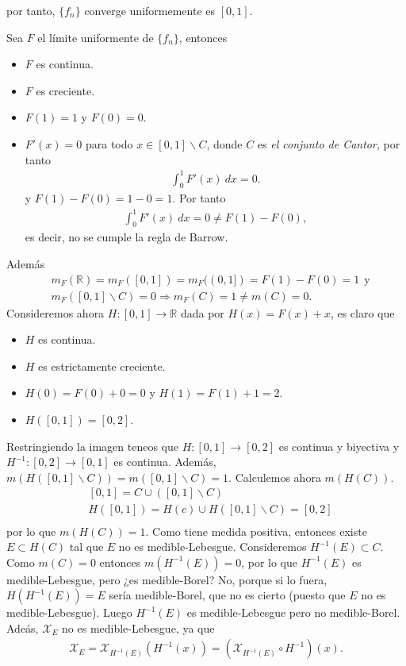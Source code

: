 \begin{ejemplo}
\begin{itemize}
    por tanto, $\{f_n\}$ converge uniformemente es $[0,1]$.
\end{itemize}
Sea $F$ el límite uniformente de $\{f_n\}$, entonces
\begin{itemize}
    \item $F$ es continua.
    \item $F$ es creciente.
    \item $F(1) = 1$ y $F(0) = 0$.
    \item $F'(x) = 0$ para todo $x \in [0,1] \backslash C$, donde $C$ es \textit{el conjunto de Cantor}, por tanto
    \begin{align*}
        \int_{0}^{1}{F'(x) \ dx}  = 0.
    \end{align*}
    y $F(1) - F(0) = 1 - 0 = 1$. Por tanto
    \begin{align*}
        \int_{0}^{1}{F'(x) \ dx}  = 0 \not = F(1) - F(0),
    \end{align*}
    es decir, no se cumple la regla de Barrow.
\end{itemize}
Además
\begin{align*}
    &m_F(\mathbb{R}) = m_F([0,1]) = m_F((0,1]) = F(1) - F(0) = 1 \ \ \text{y} \\
    &m_F([0,1] \backslash C) = 0 \Longrightarrow m_F(C) = 1 \not = m(C) = 0.
\end{align*}
Consideremos ahora $H: [0,1] \longrightarrow \mathbb{R}$ dada por $H(x) = F(x) + x$, es claro que
\begin{itemize}
    \item $H$ es continua.
    \item $H$ es estrictamente creciente.
    \item $H(0) = F(0) + 0 = 0$ y $H(1) = F(1) + 1 = 2$.
    \item $H([0,1]) = [0,2]$.
\end{itemize}
Restringiendo la imagen teneos que $H : [0,1] \longrightarrow [0,2]$ es continua y biyectiva y $H^{-1} : [0,2] \longrightarrow [0,1]$ es continua. Además, $m(H([0,1]\backslash C)) = m([0,1]\backslash C) = 1$. Calculemos ahora $m(H(C))$.
\begin{align*}
    &[0,1] = C \cup ([0,1] \backslash C) \\
    &H([0,1]) = H(c) \cup H([0,1] \backslash C) = [0,2]\\
\end{align*}
por lo que $m(H(C)) = 1$. Como tiene medida positiva, entonces existe $E \subset H(C)$ tal que $E$ no es medible-Lebesgue. Consideremos $H^{-1}(E) \subset C$. Como $m(C) = 0$ entonces $m(H^{-1}(E)) = 0$, por lo que $H^{-1}(E)$ es medible-Lebesgue, pero ¿es medible-Borel? No, porque si lo fuera, $H(H^{-1}(E)) = E$ sería medible-Borel, que no es cierto (puesto que $E$ no es medible-Lebesgue). Luego $H^{-1}(E)$ es medible-Lebesgue pero no medible-Borel.
\\
\newline
Adeás, $\mathcal{X}_E$ no es medible-Lebesgue, ya que
\begin{align*}
    \mathcal{X}_E = \mathcal{X}_{H^{-1}(E)}(H^{-1}(x)) = (\mathcal{X}_{H^{-1}(E)} \circ H^{-1})(x).
\end{align*}
\end{ejemplo}
